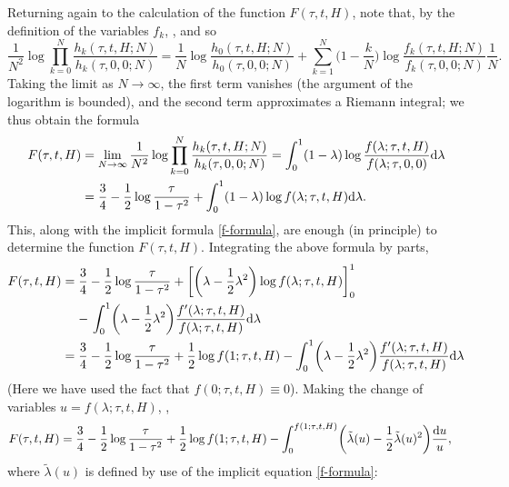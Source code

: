 \documentclass[pdftex]{sigma}
\numberwithin{equation}{section}
\begin{document}
Returning again to the calculation of the function $F(\tau,t,H)$, note that, by the definition of the variables $f_k$, , and so
 \begin{equation*}
 \frac{1}{N^2} \log \prod_{k=0}^N \frac{h_k(\tau,t,H;N)}{h_k(\tau,0,0;N)} = \frac{1}{N} \log \frac{h_0(\tau,t,H;N)}{h_0(\tau,0,0;N)} + \sum_{k=1}^N \biggl(1-\frac{k}{N}\biggr) \log \frac{f_k(\tau,t,H;N)}{f_k(\tau,0,0;N)} \frac{1}{N}.
 \end{equation*}
Taking the limit as $N\to \infty$, the first term vanishes (the argument of the logarithm is bounded), and the second term approximates a
Riemann integral; we thus obtain the formula
 \begin{align}
 F(\tau,t,H) &= \lim_{N \to \infty} \frac{1}{N^2} \log \prod_{k=0}^N \frac{h_k(\tau,t,H;N)}{h_k(\tau,0,0;N)} = \int_{0}^{1}(1-\lambda) \log\frac{f(\lambda;\tau,t,H)}{f(\lambda;\tau,0,0)} {\rm d}\lambda \nonumber \\
 &= \frac{3}{4} - \frac{1}{2}\log \frac{\tau}{1-\tau^2} + \int_{0}^{1}(1-\lambda) \log f(\lambda;\tau,t,H) {\rm d}\lambda \label{Free2}.
 \end{align}
This, along with the implicit formula \eqref{f-formula}, are enough (in principle) to determine the function $F(\tau,t,H)$. Integrating the above formula by parts,
 \begin{align*}
 F(\tau,t,H)={}& \frac{3}{4} - \frac{1}{2}\log \frac{\tau}{1-\tau^2} + \biggl[\biggl(\lambda-\frac{1}{2}\lambda^2\biggr)\log f(\lambda;\tau,t,H)\biggr]_{0}^{1}\\
 &{}{-}\,\int_{0}^{1} \biggl(\lambda-\frac{1}{2}\lambda^2\biggr) \frac{f'(\lambda;\tau,t,H)}{f(\lambda;\tau,t,H)} {\rm d}\lambda\\
={}& \frac{3}{4} - \frac{1}{2}\log \frac{\tau}{1-\tau^2} + \frac{1}{2}\log f(1;\tau,t,H) - \int_{0}^{1}\biggl(\lambda-\frac{1}{2}\lambda^2\biggr)\frac{f'(\lambda;\tau,t,H)}{f(\lambda;\tau,t,H)} {\rm d}\lambda
 \end{align*}
(Here we have used the fact that $f(0;\tau,t,H) \equiv 0$). Making the change of variables $u = f(\lambda;\tau,t,H)$,
,
 \begin{align*}
 &F(\tau,t,H)= \frac{3}{4} - \frac{1}{2}\log \frac{\tau}{1-\tau^2} + \frac{1}{2}\log f(1;\tau,t,H) - \int_{0}^{f(1;\tau,t,H)}\biggl(\tilde{\lambda}(u)-\frac{1}{2}\tilde{\lambda}(u)^2\biggr) \frac{{\rm d}u}{u},
 \end{align*}
where $\tilde{\lambda}(u)$ is defined by use of the implicit equation \eqref{f-formula}:
\end{document}
